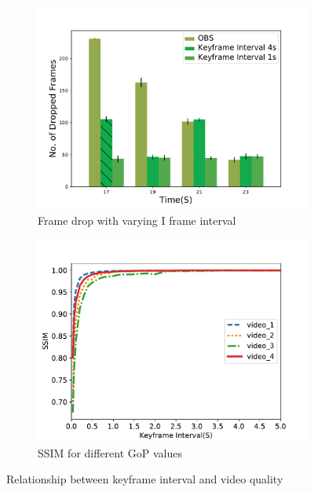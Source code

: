 \begin{figure}[htb]
\centering
\begin{subfigure}[b]{.45\columnwidth}
\centering
\includegraphics[width=\linewidth]{fig/eval_IframeInterval_drop.pdf}
\caption{Frame drop with varying I frame interval}
\label{fig:iframe-drop}
\end{subfigure}
\begin{subfigure}[b]{.45\columnwidth}
\centering
\includegraphics[width=\textwidth]{fig/ssim_gop.pdf}
\caption{SSIM for different GoP values}
\label{fig:ssim_gop}
\end{subfigure}
\caption{Relationship between keyframe interval and video quality}
\vspace{-0.2in}
\label{fig:gop}
\end{figure}

